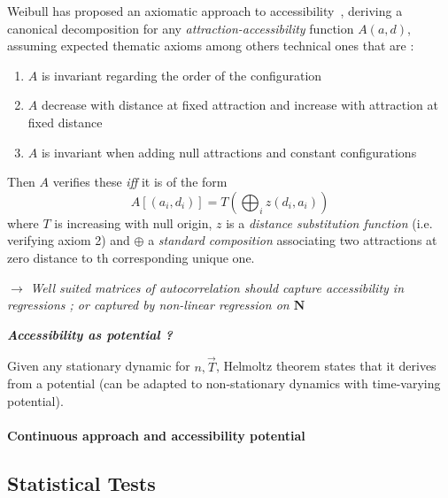 Weibull has proposed an axiomatic approach to accessibility~\cite{weibull1976axiomatic}, deriving a canonical decomposition for any \emph{attraction-accessibility} function $A(a,d)$, assuming expected thematic axioms among others technical ones that are :
\begin{enumerate}
\item \footnotesize $A$ is invariant regarding the order of the configuration
\item \footnotesize $A$ decrease with distance at fixed attraction and increase with attraction at fixed distance
\item \footnotesize $A$ is invariant when adding null attractions and constant configurations
\end{enumerate}
Then $A$ verifies these \emph{iff} it is of the form
\[
A\left[(a_i,d_i)\right] = T\left(\bigoplus_i z(d_i,a_i)\right)
\]
where $T$ is increasing with null origin, $z$ is a \emph{distance substitution function} (i.e. verifying axiom 2) and $\oplus$ a \emph{standard composition} associating two attractions at zero distance to th corresponding unique one. 

$\rightarrow$ \textit{Well suited matrices of autocorrelation should capture accessibility in regressions ; or captured by non-linear regression on $\mathbf{N}$}

\medskip

{\normalsize\textit{\textbf{Accessibility as potential ?}}}

Given any stationary dynamic for $n,\vec{T}$, Helmoltz theorem states that it derives from a potential (can be adapted to non-stationary dynamics with time-varying potential).








\paragraph{Continuous approach and accessibility potential}







\subsection{Statistical Tests}



